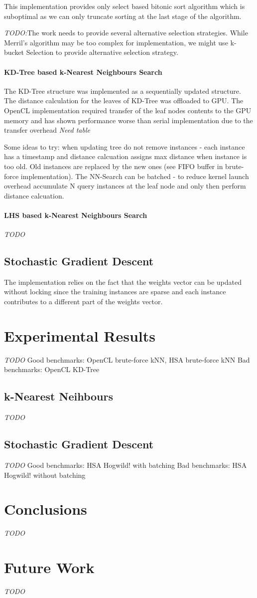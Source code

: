 \documentclass[]{report}
\begin{document}
This implementation provides only select based bitonic sort\cite{Batcher:1968:SNA:1468075.1468121} algorithm which is suboptimal as we can only truncate sorting at the last stage of the algorithm.

\textit{TODO:}The work needs to provide several alternative selection strategies. While Merril's algorithm may be too complex for implementation, we might use k-bucket Selection\cite{Alabi2012} to provide alternative selection strategy.

\paragraph*{KD-Tree based k-Nearest Neighbours Search}
 The KD-Tree structure was implemented as a sequentially updated structure. The distance calculation for the leaves of KD-Tree was offloaded to GPU. 
The OpenCL implementation required transfer of the leaf nodes contents to the GPU memory and has shown performance worse than serial implementation due to the transfer overhead \textit{Need table}

Some ideas to try: when updating tree do not remove instances - each instance has a timestamp and distance calcuation assigns max distance when instance is too old. Old instances are replaced by the new ones (see FIFO buffer in brute-force implementation). 
The NN-Search can be batched - to reduce kernel launch overhead accumulate N query instances at the leaf node and only then perform distance calcuation.\cite{Garcia2008}

\paragraph*{LHS based k-Nearest Neighbours Search}
\textit{TODO}
 
\subsection*{Stochastic Gradient Descent}
The implementation relies on the fact that the weights vector can be updated without locking since the training instances are sparse and each instance contributes to a different part of the weights vector\cite{Niu11hogwild:a}.
\section*{Experimental Results}
\textit{TODO}
Good benchmarks: OpenCL brute-force kNN, HSA brute-force kNN
Bad benchmarks: OpenCL KD-Tree
\subsection*{k-Nearest Neihbours}
\textit{TODO}
\subsection*{Stochastic Gradient Descent}
\textit{TODO}
Good benchmarks: HSA Hogwild! with batching
Bad benchmarks: HSA Hogwild! without batching
\section*{Conclusions}
\textit{TODO}
\section*{Future Work}
\textit{TODO}




\end{document}
